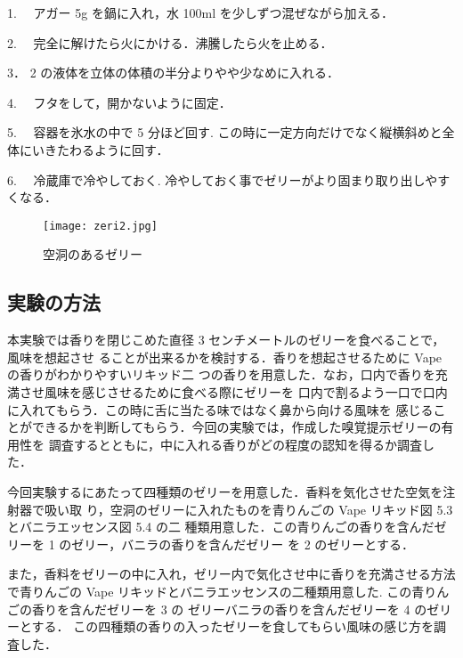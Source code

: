 1. 　アガー 5g を鍋に入れ，水 100ml を少しずつ混ぜながら加える．


2. 　完全に解けたら火にかける．沸騰したら火を止める．


3． 2 の液体を立体の体積の半分よりやや少なめに入れる．


4. 　フタをして，開かないように固定．


5. 　容器を氷水の中で 5 分ほど回す. この時に一定方向だけでなく縦横斜めと全体にいきたわるように回す．


6. 　冷蔵庫で冷やしておく. 冷やしておく事でゼリーがより固まり取り出しやすくなる．


  \begin{figure}[h]
    \centering
    \texttt{[image: zeri2.jpg]}
    \caption{空洞のあるゼリー}
    \label{zeri}
  \end{figure}


\subsection{実験の方法}

本実験では香りを閉じこめた直径 3 センチメートルのゼリーを食べることで，風味を想起させ
ることが出来るかを検討する．香りを想起させるために Vape の香りがわかりやすいリキッド二
つの香りを用意した．なお，口内で香りを充満させ風味を感じさせるために食べる際にゼリーを
口内で割るよう一口で口内に入れてもらう．この時に舌に当たる味ではなく鼻から向ける風味を
感じることができるかを判断してもらう．今回の実験では，作成した嗅覚提示ゼリーの有用性を
調査するとともに，中に入れる香りがどの程度の認知を得るか調査した．


今回実験するにあたって四種類のゼリーを用意した．香料を気化させた空気を注射器で吸い取
り，空洞のゼリーに入れたものを青りんごの Vape リキッド図 5.3 とバニラエッセンス図 5.4 の二
種類用意した．この青りんごの香りを含んだゼリーを 1 のゼリー，バニラの香りを含んだゼリー
を 2 のゼリーとする．


また，香料をゼリーの中に入れ，ゼリー内で気化させ中に香りを充満させる方法で青りんごの
Vape リキッドとバニラエッセンスの二種類用意した. この青りんごの香りを含んだゼリーを 3 の
ゼリーバニラの香りを含んだゼリーを 4 のゼリーとする．
この四種類の香りの入ったゼリーを食してもらい風味の感じ方を調査した．